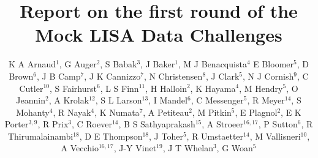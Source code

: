 \documentclass[12pt]{iopart}
\begin{document}
\title[MLDC first round report]{Report on the first round of the Mock LISA Data Challenges}

\author{K A Arnaud$^1$,
G Auger$^2$,
S Babak$^3$,
J Baker$^1$,
M J Benacquista$^4$
E Bloomer$^5$,
D Brown$^6$,
J B Camp$^7$,
J K Cannizzo$^7$,
N Christensen$^8$,
J Clark$^5$,
N J Cornish$^9$,
C Cutler$^{10}$,
S Fairhurst$^6$,
L S Finn$^{11}$,
H Halloin$^2$,
K Hayama$^4$,
M Hendry$^5$,
O Jeannin$^2$,
A Krolak$^{12}$,
S L Larson$^{13}$,
I Mandel$^6$,
C Messenger$^5$,
R Meyer$^{14}$,
S Mohanty$^4$,
R Nayak$^4$,
K Numata$^7$,
A Petiteau$^2$,
M Pitkin$^5$,
E Plagnol$^2$,
E K Porter$^{3,9}$,
R Prix$^3$,
C Roever$^{14}$,
B S Sathyaprakash$^{15}$,
A Stroeer$^{16,17}$,
P Sutton$^{6}$,
R Thirumalainambi$^{18}$,
D E Thompson$^{18}$,
J Toher$^5$,
R Umstaetter$^{14}$,
M Vallisneri$^{10}$,
A Vecchio$^{16,17}$,
J-Y Vinet$^{19}$,
J T Whelan$^3$,
G Woan$^5$}
\end{document}
